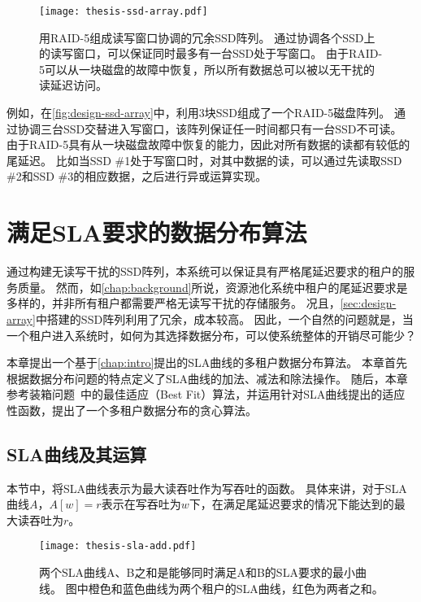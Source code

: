 \begin{figure}[h]
  \centering
  \texttt{[image: thesis-ssd-array.pdf]}
  \caption{
        用RAID-5组成读写窗口协调的冗余SSD阵列。
        通过协调各个SSD上的读写窗口，可以保证同时最多有一台SSD处于写窗口。
        由于RAID-5可以从一块磁盘的故障中恢复，所以所有数据总可以被以无干扰的读延迟访问。
      }
  \label{fig:design-ssd-array}
\end{figure}

例如，在\autoref{fig:design-ssd-array}中，利用3块SSD组成了一个RAID-5磁盘阵列。
通过协调三台SSD交替进入写窗口，该阵列保证任一时间都只有一台SSD不可读。
由于RAID-5具有从一块磁盘故障中恢复的能力，因此对所有数据的读都有较低的尾延迟。
比如当SSD \#1处于写窗口时，对其中数据的读，可以通过先读取SSD \#2和SSD \#3的相应数据，之后进行异或运算实现。

\section{满足SLA要求的数据分布算法}
\label{sec:design-allocation}

通过构建无读写干扰的SSD阵列，本系统可以保证具有严格尾延迟要求的租户的服务质量。
然而，如\autoref{chap:background}所说，资源池化系统中租户的尾延迟要求是多样的，并非所有租户都需要严格无读写干扰的存储服务。
况且，\autoref{sec:design-array}中搭建的SSD阵列利用了冗余，成本较高。
因此，一个自然的问题就是，当一个租户进入系统时，如何为其选择数据分布，可以使系统整体的开销尽可能少？

本章提出一个基于\autoref{chap:intro}提出的SLA曲线的多租户数据分布算法。
本章首先根据数据分布问题的特点定义了SLA曲线的加法、减法和除法操作。
随后，本章参考装箱问题~\cite{wiki:Bin-packing}中的最佳适应（Best Fit）算法，并运用针对SLA曲线提出的适应性函数，提出了一个多租户数据分布的贪心算法。

\subsection{SLA曲线及其运算}
\label{sec:design-allocation-sla-arithmetic}

本节中，将SLA曲线表示为最大读吞吐作为写吞吐的函数。
具体来讲，对于SLA曲线$A$，$A[w] = r$表示在写吞吐为$w$下，在满足尾延迟要求的情况下能达到的最大读吞吐为$r$。

\begin{figure}[h]
  \centering
  \texttt{[image: thesis-sla-add.pdf]}
  \caption{
        两个SLA曲线A、B之和是能够同时满足A和B的SLA要求的最小曲线。
        图中橙色和蓝色曲线为两个租户的SLA曲线，红色为两者之和。
      }
  \label{fig:design-sla-add}
\end{figure}

